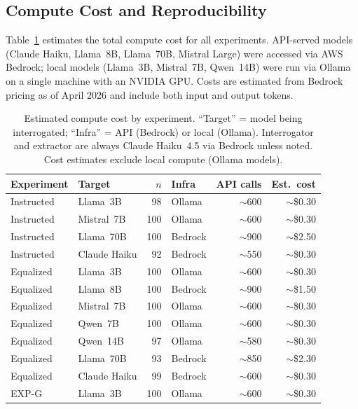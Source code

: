 \subsection{Compute Cost and Reproducibility}
\label{app:compute_cost}

Table~\ref{tab:compute_cost} estimates the total compute cost for all experiments. API-served models (Claude Haiku, Llama~8B, Llama~70B, Mistral Large) were accessed via AWS Bedrock; local models (Llama~3B, Mistral~7B, Qwen~14B) were run via Ollama on a single machine with an NVIDIA GPU. Costs are estimated from Bedrock pricing as of April 2026 and include both input and output tokens.

\begin{table}[h]
\centering
\caption{Estimated compute cost by experiment. ``Target'' = model being interrogated; ``Infra'' = API (Bedrock) or local (Ollama). Interrogator and extractor are always Claude Haiku~4.5 via Bedrock unless noted. Cost estimates exclude local compute (Ollama models).}
\label{tab:compute_cost}
\begin{small}
\begin{tabular}{llrlrr}
\toprule
\textbf{Experiment} & \textbf{Target} & \textbf{$n$} & \textbf{Infra} & \textbf{API calls} & \textbf{Est.\ cost} \\
\midrule
Instructed & Llama~3B & 98 & Ollama & $\sim$600 & $\sim$\$0.30 \\
Instructed & Mistral~7B & 100 & Ollama & $\sim$600 & $\sim$\$0.30 \\
Instructed & Llama~70B & 100 & Bedrock & $\sim$900 & $\sim$\$2.50 \\
Instructed & Claude Haiku & 92 & Bedrock & $\sim$550 & $\sim$\$0.30 \\
\midrule
Equalized & Llama~3B & 100 & Ollama & $\sim$600 & $\sim$\$0.30 \\
Equalized & Llama~8B & 100 & Bedrock & $\sim$900 & $\sim$\$1.50 \\
Equalized & Mistral~7B & 100 & Ollama & $\sim$600 & $\sim$\$0.30 \\
Equalized & Qwen~7B & 100 & Ollama & $\sim$600 & $\sim$\$0.30 \\
Equalized & Qwen~14B & 97 & Ollama & $\sim$580 & $\sim$\$0.30 \\
Equalized & Llama~70B & 93 & Bedrock & $\sim$850 & $\sim$\$2.30 \\
Equalized & Claude Haiku & 99 & Bedrock & $\sim$600 & $\sim$\$0.30 \\
\midrule
EXP-G & Llama~3B & 100 & Ollama & $\sim$600 & $\sim$\$0.30 \\

\end{tabular}
\end{small}
\end{table}
